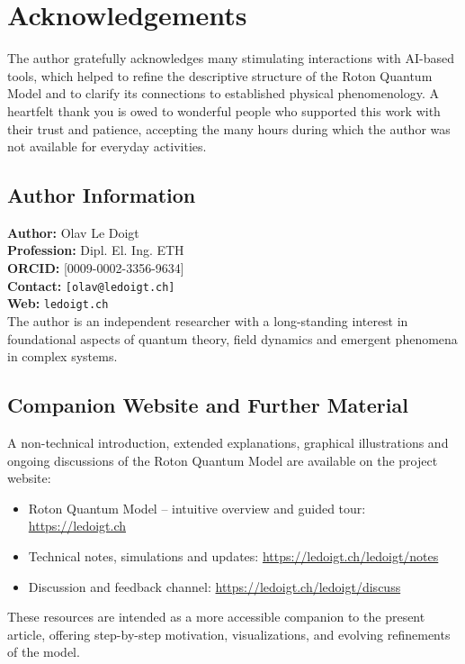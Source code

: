 \documentclass[11pt,a4paper]{article}
\begin{document}

\section*{Acknowledgements}

The author gratefully acknowledges many stimulating interactions with AI-based tools, which helped to refine the descriptive structure of the Roton Quantum Model and to clarify its connections to established physical phenomenology. 
A heartfelt thank you is owed to wonderful people who supported this work with their trust and patience, accepting the many hours during which the author was not available for everyday activities.

\subsection*{Author Information}
\textbf{Author:} Olav Le Doigt \\
\textbf{Profession:} Dipl. El. Ing. ETH\\

\textbf{ORCID:} [0009-0002-3356-9634] \\
\textbf{Contact:} \texttt{[olav@ledoigt.ch]} \\
\textbf{Web:} \texttt{ledoigt.ch} \\[0.5em]
The author is an independent researcher with a long-standing interest in foundational aspects 
of quantum theory, field dynamics and emergent phenomena in complex systems.

\subsection*{Companion Website and Further Material}
A non-technical introduction, extended explanations, graphical illustrations and ongoing 
discussions of the Roton Quantum Model are available on the project website:
\begin{itemize}
  \item Roton Quantum Model – intuitive overview and guided tour: \url{https://ledoigt.ch}
  \item Technical notes, simulations and updates: \url{https://ledoigt.ch/ledoigt/notes}
  \item Discussion and feedback channel: \url{https://ledoigt.ch/ledoigt/discuss}
\end{itemize}
These resources are intended as a more accessible companion to the present article, 
offering step-by-step motivation, visualizations, and evolving refinements of the model.
\end{document}
